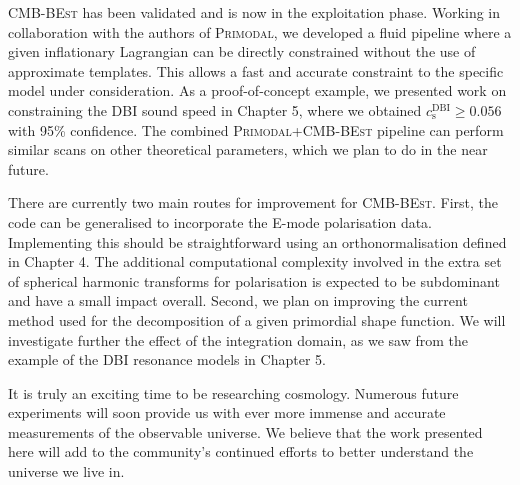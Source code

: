 \textsc{CMB-BEst} has been validated and is now in the exploitation phase. Working in collaboration with the authors of \textsc{Primodal}, we developed a fluid pipeline where a given inflationary Lagrangian can be directly constrained without the use of approximate templates. This allows a fast and accurate constraint to the specific model under consideration. As a proof-of-concept example, we presented work on constraining the DBI sound speed in Chapter 5, where we obtained $c_\text{s}^\text{DBI} \ge 0.056$ with 95\% confidence. The combined \textsc{Primodal}+\textsc{CMB-BEst} pipeline can perform similar scans on other theoretical parameters, which we plan to do in the near future.

There are currently two main routes for improvement for \textsc{CMB-BEst}. First, the code can be generalised to incorporate the E-mode polarisation data. Implementing this should be straightforward using an orthonormalisation defined in Chapter 4. The additional computational complexity involved in the extra set of spherical harmonic transforms for polarisation is expected to be subdominant and have a small impact overall. Second, we plan on improving the current method used for the decomposition of a given primordial shape function. We will investigate further the effect of the integration domain, as we saw from the example of the DBI resonance models in Chapter 5.

It is truly an exciting time to be researching cosmology. Numerous future experiments will soon provide us with ever more immense and accurate measurements of the observable universe. We believe that the work presented here will add to the community's continued efforts to better understand the universe we live in.